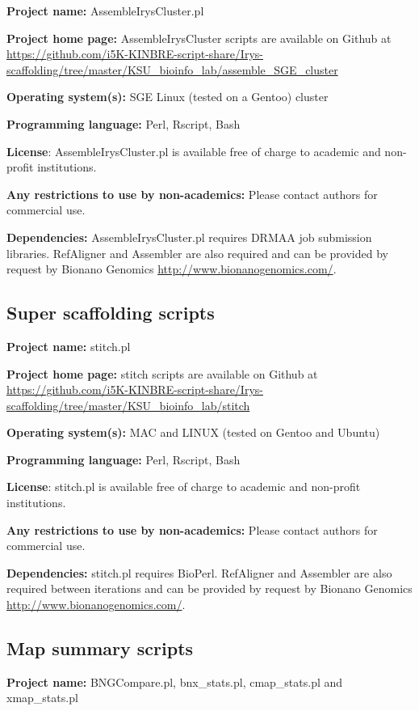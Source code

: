 \documentclass{bmcart}
\begin{document}
\textbf{Project name:} AssembleIrysCluster.pl

\textbf{Project home page:} AssembleIrysCluster scripts are available on Github at \url{https://github.com/i5K-KINBRE-script-share/Irys-scaffolding/tree/master/KSU\_bioinfo\_lab/assemble\_SGE\_cluster}

\textbf{Operating system(s):} SGE Linux (tested on a Gentoo) cluster

\textbf{Programming language:} Perl, Rscript, Bash

\textbf{License}: AssembleIrysCluster.pl is available free of charge to academic and non-profit institutions.

\textbf{Any restrictions to use by non-academics:} Please contact authors for commercial use.

\textbf{Dependencies:} AssembleIrysCluster.pl requires DRMAA job submission libraries. RefAligner and Assembler are also required and can be provided by request by Bionano Genomics \url{http://www.bionanogenomics.com/}.

\subsection*{\textbf{Super scaffolding scripts}}

\textbf{Project name:} stitch.pl

\textbf{Project home page:} stitch scripts are available on Github at \url{https://github.com/i5K-KINBRE-script-share/Irys-scaffolding/tree/master/KSU\_bioinfo\_lab/stitch}

\textbf{Operating system(s):} MAC and LINUX (tested on Gentoo and Ubuntu)

\textbf{Programming language:} Perl, Rscript, Bash

\textbf{License}: stitch.pl is available free of charge to academic and non-profit institutions.

\textbf{Any restrictions to use by non-academics:} Please contact authors for commercial use.

\textbf{Dependencies:} stitch.pl requires BioPerl. RefAligner and Assembler are also required between iterations and can be provided by request by Bionano Genomics \url{http://www.bionanogenomics.com/}.

\subsection*{\textbf{Map summary scripts}}

\textbf{Project name:} BNGCompare.pl, bnx\_stats.pl, cmap\_stats.pl and xmap\_stats.pl
\end{document}
